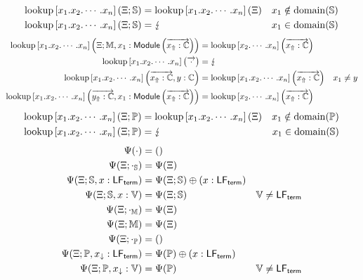 \begin{equation*}
\begin{aligned}
\operatorname{lookup}\left[x_1.x_2.\cdots.x_n\right]\left(\Xi; \mathbb{S}\right) &= \operatorname{lookup}\left[x_1.x_2.\cdots.x_n\right]\left(\Xi\right) & x_1 \notin \operatorname{domain}(\mathbb{S})\\
\operatorname{lookup}\left[x_1.x_2.\cdots.x_n\right]\left(\Xi; \mathbb{S}\right) &= \lightning & x_1 \in \operatorname{domain}(\mathbb{S})
\end{aligned}
\end{equation*}
\begin{equation*}
\begin{aligned}
\operatorname{lookup}\left[x_1.x_2.\cdots.x_n\right]\left(\Xi; \mathbb{M}, x_1 : \mathsf{Module}\left(\overrightarrow{x_\Uparrow:\mathbb{C}}\right)\right) &= \operatorname{lookup}\left[x_2.\cdots.x_n\right]\left(\overrightarrow{x_\Uparrow:\mathbb{C}}\right)\\
\operatorname{lookup}\left[x_1.x_2.\cdots.x_n\right]\left(\overrightarrow{\cdot}\right) &= \lightning\\
\operatorname{lookup}\left[x_1.x_2.\cdots.x_n\right]\left(\overrightarrow{x_\Uparrow:\mathbb{C}}, y : \mathbb{C}\right) &= \operatorname{lookup}\left[x_1.x_2.\cdots.x_n\right]\left(\overrightarrow{x_\Uparrow:\mathbb{C}}\right) & x_1 \neq y\\
\operatorname{lookup}\left[x_1.x_2.\cdots.x_n\right]\left(\overrightarrow{y_\Uparrow:\mathbb{C}}, x_1: \mathsf{Module}\left(\overrightarrow{x_\Uparrow:\mathbb{C}}\right)\right) &= \operatorname{lookup}\left[x_2.\cdots.x_n\right]\left(\overrightarrow{x_\Uparrow:\mathbb{C}}\right)
\end{aligned}
\end{equation*}
\begin{equation*}
\begin{aligned}
\operatorname{lookup}\left[x_1.x_2.\cdots.x_n\right]\left(\Xi; \mathbb{P}\right) &= \operatorname{lookup}\left[x_1.x_2.\cdots.x_n\right]\left(\Xi\right) & x_1 \notin \operatorname{domain}(\mathbb{P})\\
\operatorname{lookup}\left[x_1.x_2.\cdots.x_n\right]\left(\Xi; \mathbb{P}\right) &= \lightning & x_1 \in \operatorname{domain}(\mathbb{S})
\end{aligned}
\end{equation*}
\begin{equation*}
\begin{aligned}
\Psi(\cdot) &= ()\\
\Psi(\Xi; \cdot_{\mathbb{S}}) &= \Psi(\Xi)\\
\Psi(\Xi; \mathbb{S}, x : \mathsf{LF}_{\mathsf{term}}) &= \Psi(\Xi; \mathbb{S}) \oplus (x : \mathsf{LF}_{\mathsf{term}})\\
\Psi(\Xi; \mathbb{S}, x : \mathbb{V}) &= \Psi(\Xi; \mathbb{S}) & \mathbb{V} \neq \mathsf{LF}_{\mathsf{term}}\\
\Psi(\Xi; \cdot_{\mathbb{M}}) &= \Psi(\Xi)\\
\Psi(\Xi; \mathbb{M}) &= \Psi(\Xi)\\
\Psi(\Xi; \cdot_{\mathbb{P}}) &= ()\\
\Psi(\Xi; \mathbb{P}, x_\downarrow : \mathsf{LF}_{\mathsf{term}}) &= \Psi(\mathbb{P}) \oplus (x : \mathsf{LF}_{\mathsf{term}})\\
\Psi(\Xi; \mathbb{P}, x_\downarrow : \mathbb{V}) &= \Psi(\mathbb{P}) & \mathbb{V} \neq \mathsf{LF}_{\mathsf{term}}
\end{aligned}
\end{equation*}

